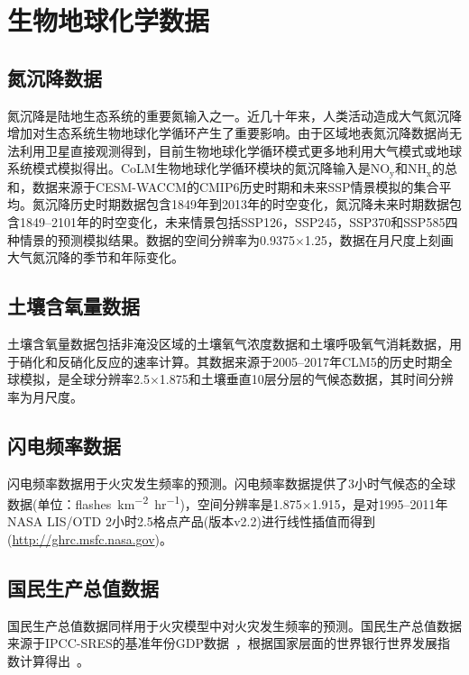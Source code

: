 \section{生物地球化学数据}

\subsection{氮沉降数据}\label{氮沉降数据}
氮沉降是陆地生态系统的重要氮输入之一。近几十年来，人类活动造成大气氮沉降增加对生态系统生物地球化学循环产生了重要影响。由于区域地表氮沉降数据尚无法利用卫星直接观测得到，目前生物地球化学循环模式更多地利用大气模式或地球系统模式模拟得出。CoLM生物地球化学循环模块的氮沉降输入是$\mathrm{NO_y}$和$\mathrm{NH_x}$的总和，数据来源于CESM-WACCM的CMIP6历史时期和未来SSP情景模拟的集合平均。氮沉降历史时期数据包含1849年到2013年的时空变化，氮沉降未来时期数据包含1849--2101年的时空变化，未来情景包括SSP126，SSP245，SSP370和SSP585四种情景的预测模拟结果。数据的空间分辨率为0.9375\textdegree$\times$1.25\textdegree，数据在月尺度上刻画大气氮沉降的季节和年际变化。


\subsection{土壤含氧量数据}\label{土壤含氧量数据}
土壤含氧量数据包括非淹没区域的土壤氧气浓度数据和土壤呼吸氧气消耗数据，用于硝化和反硝化反应的速率计算。其数据来源于2005--2017年CLM5的历史时期全球模拟，是全球分辨率2.5\textdegree$\times$1.875\textdegree 和土壤垂直10层分层的气候态数据，其时间分辨率为月尺度。


\subsection{闪电频率数据}\label{闪电频率数据}
闪电频率数据用于火灾发生频率的预测。闪电频率数据提供了3小时气候态的全球数据(单位：\unit{flashes. km^{-2}.hr^{-1}})，空间分辨率是1.875\textdegree$\times$1.915\textdegree，是对1995--2011年NASA LIS/OTD 2小时2.5\textdegree{}格点产品(版本v2.2)进行线性插值而得到(\url{http://ghrc.msfc.nasa.gov})。 


\subsection{国民生产总值数据}\label{国民生产总值数据}
国民生产总值数据同样用于火灾模型中对火灾发生频率的预测。国民生产总值数据来源于IPCC-SRES的基准年份GDP数据~\citep{van2007downscaling}，根据国家层面的世界银行世界发展指数计算得出~\citep{WorldBank2004,UNSTAT2005}。



